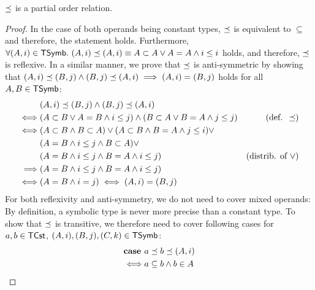 \begin{proposition}
	\label{prop:precop_is_partial_op}
	$\preceq$ is a partial order relation.
\end{proposition}
\begin{proof}
	In the case of both operands being constant types, $\preceq$ is equivalent to $\subseteq$ and therefore, the statement holds. Furthermore, $\forall (A, i) \in \mathsf{TSymb} .\ (A, i) \preceq (A, i) \equiv A \subset A \lor A = A \land i \leq i$ holds, and therefore, $\preceq$ is reflexive. In a similar manner, we prove that $\preceq$ is anti-symmetric by showing that $(A, i) \preceq (B, j) \land (B, j) \preceq (A, i) \implies (A, i) = (B, j)$ holds for all $A, B \in \mathsf{TSymb}$:
	\begin{align*}
		         & (A, i) \preceq (B, j) \land (B, j) \preceq (A, i)                                                                  \\
		\iff     & (A \subset B \lor A = B \land i \leq j) \land (B \subset A \lor B = A \land j \leq j) & (\text{def. } \preceq)     \\
		\iff     & (A \subset B \land B \subset A) \lor (A \subset B \land B = A \land j \leq i) \lor                                 \\
		         & (A = B \land i \leq j \land B \subset A) \lor                                                                      \\
		         & (A = B \land i \leq j \land B = A \land i \leq j)                                     & (\text{distrib. of } \lor) \\
		\implies & (A = B \land i \leq j \land B = A \land i \leq j)                                                                  \\
		\iff     & (A = B \land i = j) \iff (A,i) = (B,j)
	\end{align*}
	For both reflexivity and anti-symmetry, we do not need to cover mixed operands: By definition, a symbolic type is never more precise than a constant type. To show that $\preceq$ is transitive, we therefore need to cover following cases for $a, b \in \mathsf{TCst}$, $(A, i), (B, j), (C, k) \in \mathsf{TSymb}$:
	\begin{align*}
		\textbf{case } & a \precop b \precop (A,i)                                                                                          \\
		\iff           & a \subseteq b \land b \in A                                                                                        \\

\end{align*}
\end{proof}
